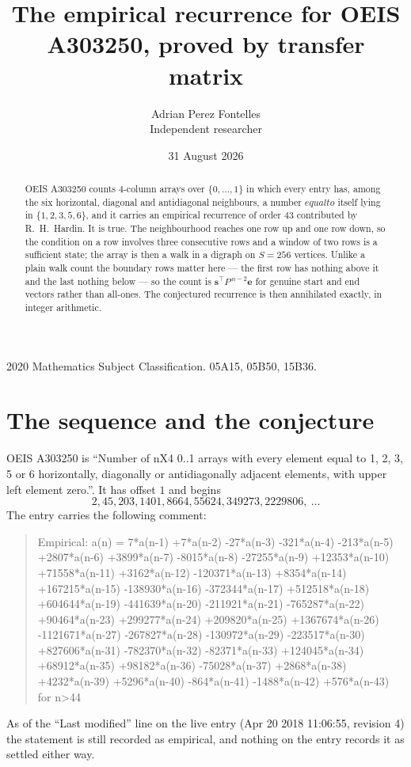 \documentclass[11pt,a4paper]{article}
\title{The empirical recurrence for OEIS A303250, proved by transfer matrix}
\author{Adrian Perez Fontelles\\ \small Independent researcher}
\date{31 August 2026}
\theoremstyle{plain}
\theoremstyle{definition}
\begin{document}
\maketitle

\begin{abstract}
OEIS A303250 counts $4$-column arrays over $\{0,\dots,1\}$ in which every entry has,
among the six horizontal, diagonal and antidiagonal neighbours, a number $equal to$ itself lying in $\{1,2,3,5,6\}$, and it carries an empirical
recurrence of order $43$ contributed by R.~H.~Hardin. It is true. The neighbourhood
reaches one row up and one row down, so the condition on a row involves three consecutive
rows and a window of two rows is a sufficient state; the array is then a walk in a digraph
on $S=256$ vertices. Unlike a plain walk count the boundary rows matter here --- the first
row has nothing above it and the last nothing below --- so the count is
$\mathbf{s}^{\!\top}P^{\,n-2}\mathbf{e}$ for genuine start and end vectors rather than
all-ones. The conjectured recurrence is then annihilated exactly, in integer arithmetic.
\end{abstract}

\noindent\small 2020 Mathematics Subject Classification. 05A15, 05B50, 15B36.\normalsize

\section{The sequence and the conjecture}

OEIS A303250 is ``Number of nX4 0..1 arrays with every element equal to 1, 2, 3, 5 or 6 horizontally, diagonally or antidiagonally adjacent elements, with upper left element zero.''. It has offset
$1$ and begins
\[
2, 45, 203, 1401, 8664, 55624, 349273, 2229806,\ \dots
\]
The entry carries the following comment:
\begin{quote}\small
Empirical: a(n) = 7*a(n-1) +7*a(n-2) -27*a(n-3) -321*a(n-4) -213*a(n-5) +2807*a(n-6) +3899*a(n-7) -8015*a(n-8) -27255*a(n-9) +12353*a(n-10) +71558*a(n-11) +3162*a(n-12) -120371*a(n-13) +8354*a(n-14) +167215*a(n-15) -138930*a(n-16) -372344*a(n-17) +512518*a(n-18) +604644*a(n-19) -441639*a(n-20) -211921*a(n-21) -765287*a(n-22) +90464*a(n-23) +299277*a(n-24) +209820*a(n-25) +1367674*a(n-26) -1121671*a(n-27) -267827*a(n-28) -130972*a(n-29) -223517*a(n-30) +827606*a(n-31) -782370*a(n-32) -82371*a(n-33) +124045*a(n-34) +68912*a(n-35) +98182*a(n-36) -75028*a(n-37) +2868*a(n-38) +4232*a(n-39) +5296*a(n-40) -864*a(n-41) -1488*a(n-42) +576*a(n-43) for n>44
\end{quote}
As of the ``Last modified'' line on the live entry (Apr 20 2018 11:06:55, revision
4) the statement is still recorded as empirical, and nothing on the entry
records it as settled either way.
\end{document}
